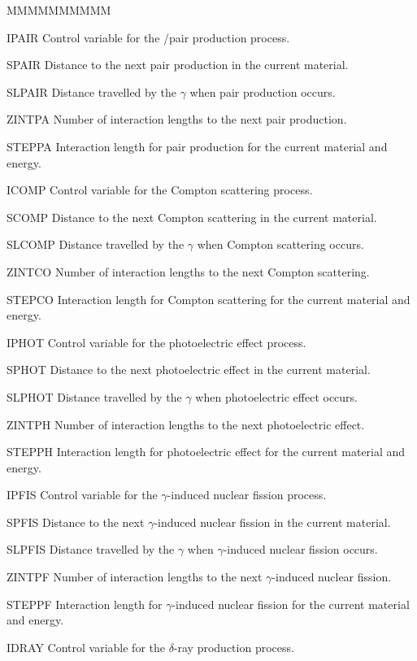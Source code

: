 \begin{DLtt}{MMMMMMMMMM}
\item[IPAIR] Control variable for the \Pem/\Pep pair production process.
\item[SPAIR] Distance to the next pair production in the current material.
\item[SLPAIR] Distance travelled by the $\gamma$ when pair production occurs.
\item[ZINTPA] Number of interaction lengths to the next pair production.
\item[STEPPA] Interaction length for pair production for the current material
and energy.
\item[ICOMP] Control variable for the Compton scattering process.
\item[SCOMP] Distance to the next Compton scattering in the current material.
\item[SLCOMP] Distance travelled by the $\gamma$ when Compton scattering occurs.
\item[ZINTCO] Number of interaction lengths to the next Compton scattering.
\item[STEPCO] Interaction length for Compton scattering for the current material
and energy.
\item[IPHOT] Control variable for the photoelectric effect process.
\item[SPHOT] Distance to the next photoelectric effect in the current material.
\item[SLPHOT] Distance travelled by the $\gamma$ when photoelectric effect occurs.
\item[ZINTPH] Number of interaction lengths to the next photoelectric effect.
\item[STEPPH] Interaction length for photoelectric effect for the current material
and energy.
\item[IPFIS] Control variable for the $\gamma$-induced nuclear fission process.
\item[SPFIS] Distance to the next $\gamma$-induced nuclear fission in the current 
material.
\item[SLPFIS] Distance travelled by the $\gamma$ when $\gamma$-induced nuclear 
fission occurs.
\item[ZINTPF] Number of interaction lengths to the next $\gamma$-induced nuclear 
fission.
\item[STEPPF] Interaction length for $\gamma$-induced nuclear fission for the 
current material and energy.
\item[IDRAY] Control variable for the $\delta$-ray production process.

\end{DLtt}
